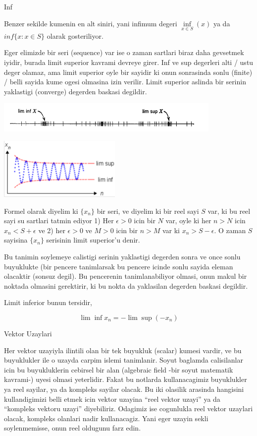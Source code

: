 \documentclass[12pt,fleqn]{article}
\begin{document}
Inf

Benzer sekilde kumenin en alt siniri, yani infimum degeri $\inf\limits_{x
  \in S}(x)$ ya 
da $inf\{x:x \in
S\}$ olarak gosteriliyor. 

Eger elimizde bir seri (sequence) var ise o zaman sartlari biraz daha
gevsetmek iyidir, burada limit superior kavrami devreye girer. Inf ve sup
degerleri alti / ustu deger olamaz, ama limit superior oyle bir sayidir ki
onun sonrasinda sonlu (finite) / belli sayida kume ogesi olmasina izin
verilir. Limit superior aslinda bir serinin yaklastigi (converge) degerden
baskasi degildir. 

\includegraphics[height=1.5cm]{2_1.png}

\includegraphics[height=3cm]{2_2.png}

Formel olarak diyelim ki $\{x_n\}$ bir seri, ve diyelim ki bir reel
sayi $S$ var, ki bu reel sayi su sartlari tatmin ediyor 
1) Her $\epsilon > 0$ icin bir $N$ var, oyle ki her $n>N$ icin $x_n
< S + \epsilon$ 
ve 2) her $\epsilon > 0$ ve $M>0$ icin bir  $n>M$ var ki $x_n
> S - \epsilon$. O 
zaman $S$ sayisina  $\{x_n\}$ serisinin limit superior'u denir. 

Bu tanimin soylemeye calistigi serinin yaklastigi degerden sonra ve once
sonlu buyuklukte (bir pencere tanimlarsak bu pencere icinde sonlu sayida
eleman olacaktir (sonsuz degil). Bu pencerenin tanimlanabiliyor olmasi,
onun makul bir noktada olmasini gerektirir, ki bu nokta da yaklasilan
degerden baskasi degildir. 

Limit inferior bunun tersidir, 

\[ \lim \inf x_n  = -\lim \sup(-x_n)\]

Vektor Uzaylari 

Her vektor uzayiyla ilintili olan bir tek buyukluk (scalar) kumesi vardir,
ve bu buyuklukler ile o uzayda carpim islemi tanimlanir. Soyut baglamda
calisilanlar icin bu buyukluklerin cebirsel bir alan (algebraic field -bir
soyut matematik kavrami-) uyesi olmasi yeterlidir. Fakat bu notlarda
kullanacagimiz buyuklukler ya reel sayilar, ya da kompleks sayilar
olacak. Bu iki olasilik arasinda hangisini kullandigimizi belli etmek icin
vektor uzayina ``reel vektor uzayi'' ya da ``kompleks vektoru uzayi''
diyebiliriz. Odagimiz ise cogunlukla reel vektor uzaylari olacak, kompleks
olanlari nadir kullanacagiz. Yani eger uzayin sekli soylenmemisse, onun
reel oldugunu farz edin. 
\end{document}
